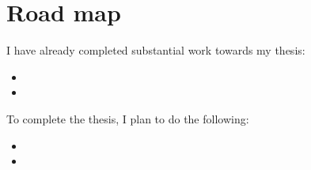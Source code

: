 \documentclass{article}
\begin{document}
\section{Road map}

I have already completed substantial work towards my thesis:

\begin{itemize}
\item {}
\item {}
\end{itemize}
To complete the thesis, I plan to do the following:
\begin{itemize}
\item {}
\item {}
\end{itemize}



\end{document}
